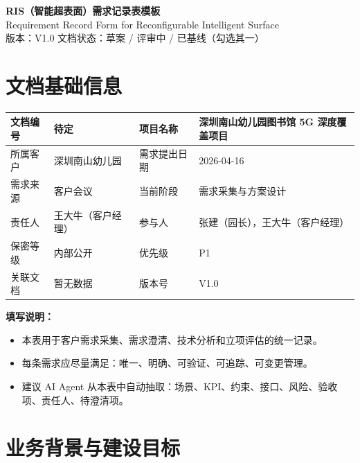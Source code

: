 \documentclass[12pt,a4paper]{ctexart}
\begin{document}
\begin{center}
    {\LARGE \bfseries RIS（智能超表面）需求记录表模板}\\[0.5em]
    {\large Requirement Record Form for Reconfigurable Intelligent Surface}\\[0.8em]
    {\small 版本：V1.0 \quad 文档状态：草案 / 评审中 / 已基线（勾选其一）}
\end{center}

\vspace{0.6em}

\section{文档基础信息}

\begin{tabularx}{\textwidth}{|P{3.2cm}|Y|P{3.2cm}|Y|}
\hline
文档编号 & 待定
 & 项目名称 & 深圳南山幼儿园图书馆 5G 深度覆盖项目
 \\ \hline
所属客户 & 深圳南山幼儿园
 & 需求提出日期 & 2026-04-16
 \\ \hline
需求来源 & 客户会议
 & 当前阶段 & 需求采集与方案设计
 \\ \hline
责任人 & 王大牛（客户经理）
 & 参与人 & 张建（园长），王大牛（客户经理）
 \\ \hline
保密等级 & 内部公开
 & 优先级 & P1
 \\ \hline
关联文档 & 暂无数据
 & 版本号 & V1.0
 \\ \hline
\end{tabularx}

\vspace{0.8em}

\textbf{填写说明：}
\begin{itemize}[leftmargin=2em]
    \item 本表用于客户需求采集、需求澄清、技术分析和立项评估的统一记录。
    \item 每条需求应尽量满足：唯一、明确、可验证、可追踪、可变更管理。
    \item 建议 AI Agent 从本表中自动抽取：场景、KPI、约束、接口、风险、验收项、责任人、待澄清项。
\end{itemize}

\section{业务背景与建设目标}
\end{document}
